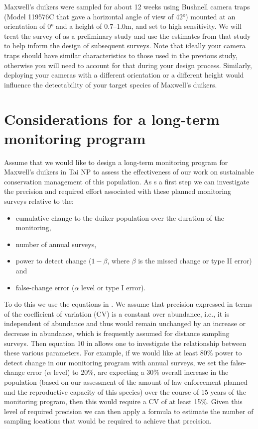 \documentclass[a4paper, 10pt]{article}
\begin{document}
Maxwell’s duikers were sampled for about 12 weeks using Bushnell camera traps (Model 119576C that gave a horizontal angle of view of 42°) mounted at an orientation of 0° and a height of 0.7–1.0m, and set to high sensitivity. We will treat the survey of \cite{howeetal} as a preliminary study and use the estimates from that study to help inform the design of subsequent surveys. Note that ideally your camera traps should have similar characteristics to those used in the previous study, otherwise you will need to account for that during your design process. Similarly, deploying your cameras with a different orientation or a different height would influence the detectability of your target species of Maxwell’s duikers.

\section{Considerations for a long-term monitoring program}

Assume that we would like to design a long-term monitoring program for Maxwell’s duikers in Tai NP to assess the effectiveness of our work on sustainable conservation management of this population.  As s a first step we can investigate the precision and required effort associated with these planned monitoring surveys relative to the:
\begin{itemize}
	\item cumulative change to the duiker population over the duration of the monitoring, 
	\item number of annual surveys,
	\item power to detect change ($1-\beta$, where $\beta$ is the missed change or type II error) and
	\item false-change error ($\alpha$ level or type I error).
\end{itemize}

To do this we use the equations in \citet{gerrodette1987}. We assume that precision expressed in terms of the coefficient of variation (CV) is a constant over abundance, i.e., it is independent of abundance and thus would remain unchanged by an increase or decrease in abundance, which is frequently assumed for distance sampling surveys. Then equation 10 in \citet{gerrodette1987} allows one to investigate the relationship between these various parameters. For example, if we would like at least 80\% power to detect change in our monitoring program with annual surveys, we set the false-change error ($\alpha$ level) to 20\%, are expecting a 30\% overall increase in the population (based on our assessment of the amount of law enforcement planned and the reproductive capacity of this species) over the course of 15 years of the monitoring program, then this would require a CV of at least 15\%. Given this level of required precision we can then apply a formula to estimate the number of sampling locations that would be required to achieve that precision. 
\end{document}
